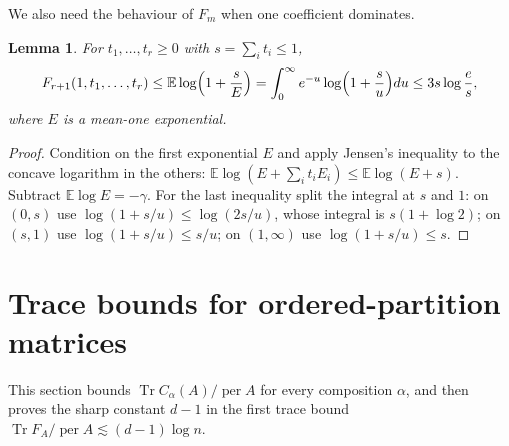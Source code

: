 \documentclass[11pt,a4paper]{article}
\newtheorem{lemma}[theorem]{Lemma}
\theoremstyle{remark}
\newcommand{\per}{\operatorname{per}}
\newcommand{\Tr}{\operatorname{Tr}}
\newcommand{\E}{\mathbb E}
\begin{document}
We also need the behaviour of $F_m$ when one coefficient dominates.
\begin{lemma}\label{lem:small}
For $t_1,\dots,t_r\ge0$ with $s=\sum_it_i\le1$,
\[
 F_{r+1}(1,t_1,\dots,t_r)\le\E\log\Bigl(1+\frac s{E}\Bigr)=\int_0^\infty e^{-u}\log\Bigl(1+\frac su\Bigr)du\le3s\log\frac es,
\]
where $E$ is a mean-one exponential.
\end{lemma}
\begin{proof}
Condition on the first exponential $E$ and apply Jensen's inequality to the concave logarithm in the others: $\E\log(E+\sum_it_iE_i)\le\E\log(E+s)$. Subtract $\E\log E=-\gamma$. For the last inequality split the integral at $s$ and $1$: on $(0,s)$ use $\log(1+s/u)\le\log(2s/u)$, whose integral is $s(1+\log2)$; on $(s,1)$ use $\log(1+s/u)\le s/u$; on $(1,\infty)$ use $\log(1+s/u)\le s$.
\end{proof}

\section{Trace bounds for ordered-partition matrices}\label{sec:trace}
This section bounds $\Tr C_\alpha(A)/\per A$ for every composition $\alpha$, and then proves the sharp constant $d-1$ in the first trace bound $\Tr F_A/\per A\lesssim(d-1)\log n$.
\end{document}
